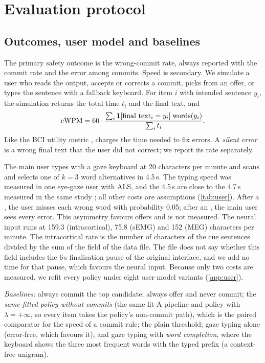 \section{Evaluation protocol}
\label{sec:protocol}

\subsection{Outcomes, user model and baselines}
The primary safety outcome is the wrong-commit rate, always reported with the commit rate and the error among commits. Speed is secondary. We simulate a user who reads the output, accepts or corrects a commit, picks from an offer, or types the sentence with a fallback keyboard. For item $i$ with intended sentence $y_i$, the simulation returns the total time $t_i$ and the final text, and
\begin{equation}
  \text{eWPM{}} = 60 \cdot \frac{\sum_i \mathbf{1}[\text{final text}_i = y_i]\;\mathrm{words}(y_i)}{\sum_i t_i}.
\end{equation}
Like the BCI utility metric \citep{dalseno2010utility}, \ewpm{} charges the time needed to fix errors. A \emph{silent error} is a wrong final text that the user did not correct; we report its rate separately.

The main user types with a gaze keyboard at 20 characters per minute and scans and selects one of $k = 3$ word alternatives in 4.5\,s. The typing speed was measured in one eye-gaze user with ALS, and the 4.5\,s are close to the 4.7\,s measured in the same study \citep{cai2024gaze}; all other costs are assumptions (\cref{tab:user}). After a , the user misses each wrong word with probability 0.05; after an , the main user sees every error. This asymmetry favours offers and is not measured. The neural input runs at 159.3 (intracortical), 75.8 (sEMG) and 152 (MEG) characters per minute. The intracortical rate is the number of characters of the cue sentences divided by the sum of the  field of the data file. The file does not say whether this field includes the 6\,s finalisation pause of the original interface, and we add no time for that pause, which favours the neural input. Because only two costs are measured, we refit every policy under eight user-model variants (\cref{app:user}).

\emph{Baselines:} always commit the top candidate; always offer and never commit; the \emph{same fitted policy without commits} (the same fit-A pipeline and policy with $\lambda = +\infty$, so every item takes the policy's non-commit path), which is the paired comparator for the speed of a commit rule; the plain threshold; gaze typing alone (error-free, which favours it); and gaze typing with \emph{word completion}, where the keyboard shows the three most frequent words with the typed prefix (a context-free unigram).

